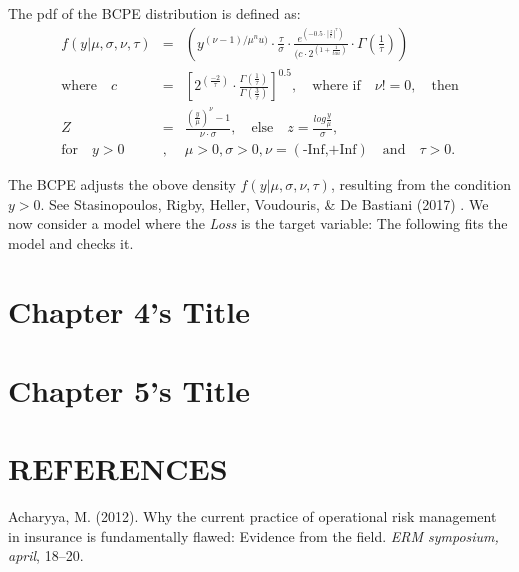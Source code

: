 \documentclass{DissertateUSU}
\begin{document}
The pdf of the BCPE distribution is defined as: \singlespacing
\begin{eqnarray}
f(y|\mu,\sigma,\nu,\tau)&=&(y^{(\nu-1)/\mu^nu)}\cdot{\frac{\tau}{\sigma}}\cdot \frac{e^(-0.5\cdot|\frac{z}{c}|^\tau)}{(c\cdot 2^(1+\frac{1}{tau})}\cdot \Gamma(\frac{1}{\tau}))\nonumber\\
\mbox{where} \quad c&=&[2^(\frac{-2}{\tau})\cdot\frac{\Gamma(\frac{1}{\tau})}{\Gamma(\frac{3}{\tau})}]^{0.5},\quad \mbox{where if}\quad \nu!=0, \quad \mbox{then} \nonumber\\
Z&=&\frac{(\frac{y}{\mu})^\nu-1}{\nu\cdot \sigma},\quad \mbox{else} \quad z=\frac{log\frac{y}{\mu}}{\sigma},\nonumber\\
\mbox{for} \quad y>0 &,& \mu>0, \sigma>0, \nu=(\mbox{-Inf,+Inf})\quad \mbox{and}\quad \tau>0.
\end{eqnarray} \doublespacing

The BCPE adjusts the obove density \(f(y|\mu,\sigma,\nu,\tau)\),
resulting from the condition \(y>0\). See Stasinopoulos, Rigby, Heller,
Voudouris, \& De Bastiani (2017) . We now consider a model where the
\emph{Loss} is the target variable: The following fits the model and
checks it.\medskip

\singlespacing

\FloatBarrier
\newpage
{}
\fancyhead[R]{\thepage}
\fancyfoot[C]{}

\chapter{Chapter 4's Title}

\FloatBarrier
\newpage
{}
\fancyhead[R]{\thepage}
\fancyfoot[C]{}

\chapter{Chapter 5's Title}

\FloatBarrier
\newpage
{}
\fancyhead[R]{\thepage}
\fancyfoot[C]{}

\chapter*{REFERENCES}

\setlength{\parindent}{-0.5in}
\setlength{\leftskip}{0.4in}
\setlength{\parskip}{6pt}

\noindent

\hypertarget{refs}{}
\leavevmode\hypertarget{ref-acharyya2012current}{}%
Acharyya, M. (2012). Why the current practice of operational risk
management in insurance is fundamentally flawed: Evidence from the
field. \emph{ERM symposium, april}, 18--20.
\end{document}
